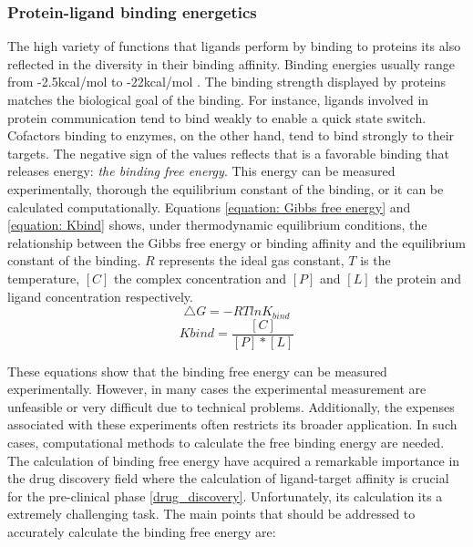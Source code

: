 \documentclass[12pt, b5paper,twoside]{tesi_upf}
\begin{document}
\subsubsection{Protein-ligand binding energetics}\label{binding_energetics}

\par The high variety of functions that ligands perform by binding to proteins its also reflected in the diversity in their binding affinity. Binding energies usually range from -2.5kcal/mol to -22kcal/mol \cite{Dunn2001}. The binding strength displayed by proteins matches the biological goal of the binding. For instance, ligands involved in protein communication tend to bind weakly to enable a quick state switch. Cofactors binding to enzymes, on the other hand,  tend to bind strongly to their targets.  The negative sign of the values reflects that is a favorable binding that releases energy: \textit{the binding free energy}.  This energy can be measured experimentally, thorough the equilibrium constant of the binding, or it can be calculated computationally. Equations \ref{equation: Gibbs free energy} and \ref{equation: Kbind} shows, under thermodynamic equilibrium conditions, the relationship between the Gibbs free energy or binding affinity and the equilibrium constant of the binding. $R$ represents the ideal gas constant, $T$ is the temperature, $[C]$ the complex concentration and $[P]$ and $[L]$ the protein and ligand concentration respectively. 
\begin{equation}\label{equation: Gibbs free energy}
\bigtriangleup G=-RTlnK_{bind} 
\end{equation}
\begin{equation}\label{equation: Kbind}
Kbind = \frac{[C]}{[P]*[L]}
\end{equation}
\par These equations show that the binding free energy can be measured experimentally. However, in many cases the experimental measurement are unfeasible or very difficult due to technical problems. Additionally, the expenses associated with these experiments often restricts its broader application. In such cases, computational methods to calculate the free binding energy are needed. The calculation of binding free energy have acquired a remarkable importance in the drug discovery field where the calculation of ligand-target affinity is crucial for the pre-clinical phase \ref{drug_discovery}. Unfortunately, its calculation its a extremely challenging task. The main points that should be addressed to accurately calculate the binding free energy are: 
\end{document}
